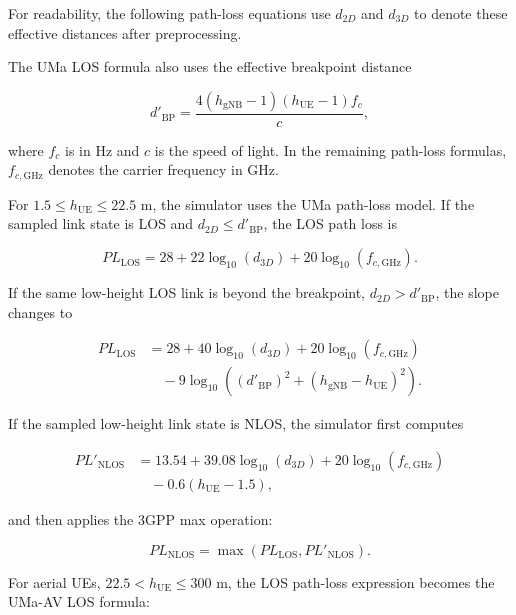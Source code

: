 For readability, the following path-loss equations use \(d_{2D}\) and \(d_{3D}\) to denote these effective distances after preprocessing.

The UMa LOS formula also uses the effective breakpoint distance

\begin{equation}
    d'_{\mathrm{BP}} =
    \frac{4(h_{\mathrm{gNB}}-1)(h_{\mathrm{UE}}-1)f_c}{c},
\end{equation}

where \(f_c\) is in Hz and \(c\) is the speed of light. In the remaining path-loss formulas, \(f_{c,\mathrm{GHz}}\) denotes the carrier frequency in GHz.

For \(1.5 \le h_{\mathrm{UE}} \le 22.5\) m, the simulator uses the UMa path-loss model. If the sampled link state is LOS and \(d_{2D}\le d'_{\mathrm{BP}}\), the LOS path loss is

\begin{equation}
    PL_{\mathrm{LOS}} =
    28+22\log_{10}(d_{3D})
    +20\log_{10}(f_{c,\mathrm{GHz}}).
\end{equation}

If the same low-height LOS link is beyond the breakpoint, \(d_{2D}>d'_{\mathrm{BP}}\), the slope changes to

\begin{align}
    PL_{\mathrm{LOS}} &=
    28+40\log_{10}(d_{3D})
    +20\log_{10}(f_{c,\mathrm{GHz}}) \nonumber\\
    &\quad -9\log_{10}\left(
    (d'_{\mathrm{BP}})^2+
    (h_{\mathrm{gNB}}-h_{\mathrm{UE}})^2
    \right).
\end{align}

If the sampled low-height link state is NLOS, the simulator first computes

\begin{align}
    PL'_{\mathrm{NLOS}} &=
    13.54+39.08\log_{10}(d_{3D})
    +20\log_{10}(f_{c,\mathrm{GHz}}) \nonumber\\
    &\quad -0.6(h_{\mathrm{UE}}-1.5),
\end{align}

and then applies the 3GPP max operation:

\begin{equation}
    PL_{\mathrm{NLOS}} =
    \max\left(PL_{\mathrm{LOS}},PL'_{\mathrm{NLOS}}\right).
\end{equation}

For aerial UEs, \(22.5<h_{\mathrm{UE}}\le300\) m, the LOS path-loss expression becomes the UMa-AV LOS formula:

